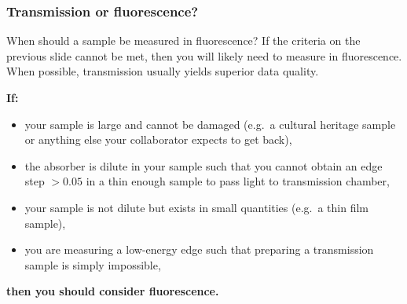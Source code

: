 \documentclass[10pt, xcolor=x11names, compress]{beamer}
\begin{document}
\begin{frame}
  \frametitle{Transmission or fluorescence?}
  
  \begin{block}{When should a sample be measured in fluorescence?}
    If the criteria on the previous slide cannot be met, then you will
    likely need to measure in fluorescence.  When possible,
    transmission usually yields superior data quality.
  \end{block}

  
  {\color{progressbar@fgblue}\Large \textbf{If:}}
  \begin{itemize}
  \item your sample is large and cannot be damaged (e.g.\ a cultural
    heritage sample or anything else your collaborator expects to get
    back),
  \item the absorber is dilute in your sample such that you cannot
    obtain an edge step $>0.05$ in a thin enough sample to pass light
    to transmission chamber,
  \item your sample is not dilute but exists in small quantities (e.g.\
    a thin film sample),
  \item you are measuring a low-energy edge such that preparing a
    transmission sample is simply impossible,
  \end{itemize}
  \begin{flushright}
    {\color{progressbar@fgblue}\large \textbf{then you should
        consider fluorescence.}}
  \end{flushright}

\end{frame}
\end{document}
